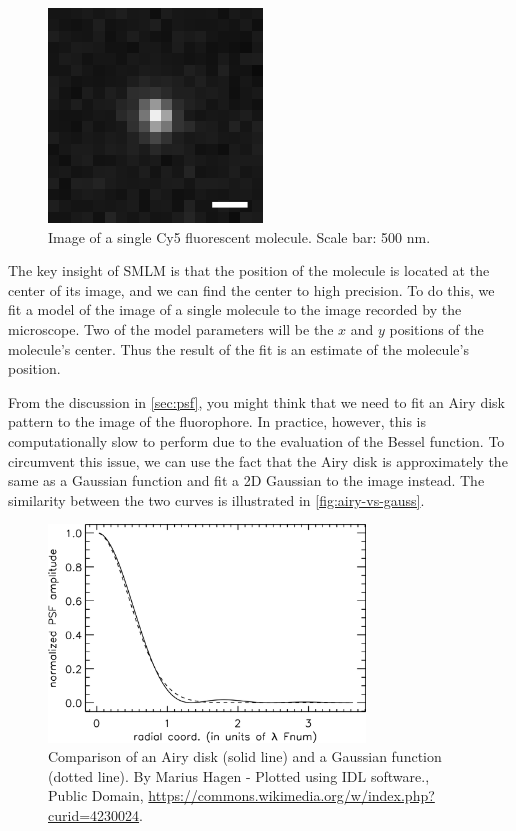 \documentclass[10pt,a4paper,oneside]{book}
\begin{document}
\begin{figure}[ht]
    \centering
    \includegraphics{image-of-single-molecule.png}
    \caption{Image of a single Cy5 fluorescent molecule. Scale bar: 500 nm.}
    \label{fig:image-of-single-molecule}
\end{figure}

The key insight of SMLM is that the position of the molecule is located at the center of its image, and we can find the center to high precision. To do this, we fit a model of the image of a single molecule to the image recorded by the microscope. Two of the model parameters will be the $x$ and $y$ positions of the molecule's center. Thus the result of the fit is an estimate of the molecule's position.

From the discussion in \autoref{sec:psf}, you might think that we need to fit an Airy disk pattern to the image of the fluorophore. In practice, however, this is computationally slow to perform due to the evaluation of the Bessel function. To circumvent this issue, we can use the fact that the Airy disk is approximately the same as a Gaussian function and fit a 2D Gaussian to the image instead. The similarity between the two curves is illustrated in \autoref{fig:airy-vs-gauss}.

\begin{figure}[ht]
    \centering
    \includegraphics[width=0.75\textwidth]{Airy_vs_gaus.png}
    \caption{Comparison of an Airy disk (solid line) and a Gaussian function (dotted line). By Marius Hagen - Plotted using IDL software., Public Domain, \url{https://commons.wikimedia.org/w/index.php?curid=4230024}.}
    \label{fig:airy-vs-gauss}
\end{figure}
\end{document}
